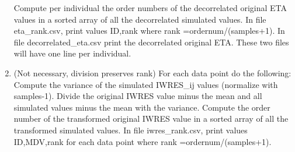 \begin{enumerate}
Compute per individual the order numbers of the decorrelated original ETA values in a sorted array of all the decorrelated simulated values. In file eta\_rank.csv, print values ID,rank where rank =ordernum/(samples+1). In file decorrelated\_eta.csv print the decorrelated original ETA. These two files will have one line per individual.
\item (Not necessary, division preserves rank) For each data point do the following: Compute the variance of the simulated IWRES\_ij values (normalize with samples-1). Divide the original IWRES value minus the mean and all simulated values minus the mean with the variance. Compute the order number of the transformed original IWRES value in a sorted array of all the transformed simulated values. In file iwres\_rank.csv, print values ID,MDV,rank for each data point where rank =ordernum/(samples+1).  
\end{enumerate}



